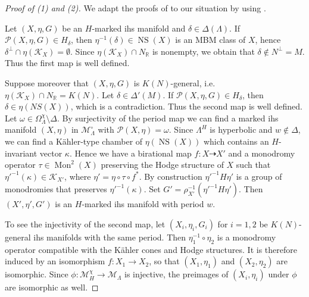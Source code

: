 \documentclass{amsart}
\theoremstyle{definition}
\theoremstyle{plain}
\DeclareMathOperator{\NS}{NS}
\DeclareMathOperator{\Mo}{Mon}
\newcommand{\RR}{\mathbb{R}}
\newcommand{\K}{\mathcal{K}}
\newcommand{\M}{\mathcal{M}}
\renewcommand{\P}{\mathcal{P}}
\begin{document}
\begin{proof}[Proof of (1) and (2)]
 We adapt the proofs of
 \cite[Thms. 4.5, 5.6]{bcs:ball} to our situation
 by using .
 
 Let $(X,\eta,G)$ be an $H$-marked ihs manifold and $\delta \in \Delta(\Lambda)$. If
 $\P(X,\eta,G) \in H_\delta$, then
 $\eta^{-1}(\delta) \in \NS(X)$ is an MBM class of $X$,
 hence $\delta^\perp \cap \eta(\K_X) = \emptyset$.
 Since $\eta(\K_X) \cap N_\RR$ is nonempty, we obtain that
 $\delta \not \in N^\perp = M$. Thus the first map
 is well defined.
 
 Suppose moreover that $(X,\eta,G)$ is $K(N)$-general,
 i.e. $\eta(\K_X) \cap N_\RR=K(N)$. Let $\delta \in \Delta'(M)$.
 If $\P(X,\eta,G) \in H_\delta$, then $\delta \in \eta(NS(X))$,
 which is a contradiction. Thus the second map is
 well defined.
 Let $\omega \in \Omega^\chi_\Lambda \setminus \Delta$.
 By surjectivity of the period map we can find a marked
 ihs manifold  $(X,\eta)$ in $\M_\Lambda^\circ$ with
 $\P(X,\eta) = \omega$. Since $\Lambda^H$ is hyperbolic and
 $w \not \in \Delta$, we can find a K\"ahler-type chamber
 of $\eta(\NS(X))$ which contains an $H$-invariant vector
 $\kappa$. Hence we have a birational map
 $f\colon X \dashrightarrow X'$ and a monodromy operator
 $\tau \in \Mo^2(X)$ preserving the Hodge structure of
 $X$ such that $\eta'^{-1}(\kappa) \in \K_{X'}$, where
 $\eta' = \eta \circ \tau \circ f^*$.
 By construction $\eta'^{-1}H \eta'$ is a group of monodromies
 that preserves $\eta'^{-1}(\kappa)$.
 Set $G'=\rho_{X'}^{-1}(\eta'^{-1}H \eta')$.
 Then $(X',\eta',G')$ is an $H$-marked ihs manifold
 with period $w$.
 
 To see the injectivity of the second map,
 let $(X_i,\eta_i,G_i)$ for $i = 1,2$ be $K(N)$-general ihs
 manifolds with the same period. Then
 $\eta_1^{-1} \circ \eta_2$ is a monodromy operator
 compatible with the K\"ahler cones and Hodge structures.
 It is therefore induced by an isomorphism
 $f\colon X_1 \rightarrow X_2$, so that $(X_1,\eta_1)$ and
 $(X_2,\eta_2)$ are isomorphic. Since $\phi\colon \M^\chi_H \rightarrow \M_\Lambda$ is injective,
 the preimages of $(X_i,\eta_i)$ under $\phi$ are isomorphic as well.
\end{proof}
\end{document}
